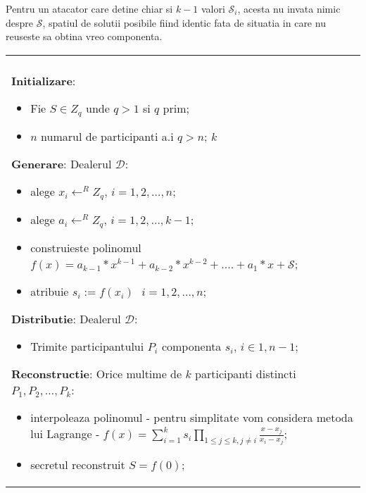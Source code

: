 \documentclass{llncs}
\begin{document}
Pentru un atacator care detine chiar si $k-1$ valori $\mathcal{S}_i$, acesta nu invata nimic despre $\mathcal{S}$, spatiul de solutii posibile fiind identic fata de situatia in care nu reuseste sa obtina vreo componenta.


\begin{figure*}[h!]

\begin{tabular}{|p{\textwidth}|}
\hline

\\
\hspace{.1in}
\textbf{Initializare}: 
	\begin{itemize}
		\item Fie $S \in Z_q$ unde $q > 1 $ si $q$ prim;
		\item $n$ numarul de participanti a.i $q > n$; $k$ 
	\end{itemize}
\medskip

\hspace{.1in}
\textbf{Generare}: Dealerul $\mathcal{D}$:
	\begin{itemize}
		\item alege $x_i \leftarrow^R Z_q \text{, }i = 1,2,\dots,n$;
		\item alege $a_{i} \leftarrow^R Z_q \text{, }i = 1,2,\dots,{k - 1}$;
		\item construieste polinomul $f(x) = a_{k - 1} * x ^ {k-1} + a_{k-2} * x ^ {k - 2} + .... + a_1 * x + \mathcal{S}$;
		\item atribuie $s_i := f(x_i) \text{ } i = 1,2,\dots,n$;
	\end{itemize}
\medskip

\hspace{.1in}
\textbf{Distributie}: Dealerul $\mathcal{D}$:
	\begin{itemize}
		\item Trimite participantului $P_i$ componenta $s_i$, $i \in {1,n-1}$;
	\end{itemize}

\hspace{.1in}
\textbf{Reconstructie}: Orice multime de $k$ participanti distincti $P_1, P_2, \dots, P_k$:
	\begin{itemize}
		\item interpoleaza polinomul - pentru simplitate vom considera metoda lui Lagrange -
			\hspace{.7in} $f(x)=\sum_{i=1}^{k} {s_i}\prod_{1 \leq j \leq k, j \neq i} \frac{x-x_j}{x_i-x_j}$;
		\item secretul reconstruit $S = f(0)$;
	\end{itemize}

\\
\hline
\end{tabular}

\label{fig:shamir_scheme}
\end{figure*}
\end{document}
